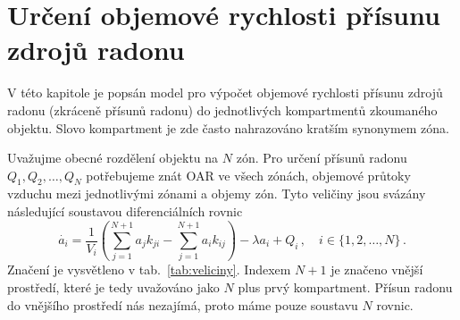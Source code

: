 \chapter{Určení objemové rychlosti přísunu zdrojů radonu}\label{navesti:model}
V této kapitole je popsán model pro výpočet objemové rychlosti přísunu zdrojů radonu (zkráceně přísunů radonu) do jednotlivých kompartmentů zkoumaného objektu. Slovo kompartment je zde často nahrazováno kratším synonymem zóna.

Uvažujme obecné rozdělení objektu na $N$ zón. Pro určení přísunů radonu $Q_1, Q_2, \ldots, Q_N$ potřebujeme znát OAR ve všech zónách, objemové průtoky vzduchu mezi jednotlivými zónami a objemy zón. Tyto veličiny jsou svázány následující soustavou diferenciálních rovnic
\begin{equation}
    \dot{a_i}=\frac{1}{V_i}\left( \sum^{N+1}_{j=1}a_j k_{ji}-\sum^{N+1}_{j=1}a_i k_{ij}\right)-\lambda a_i +Q_i\,,\quad i\in \{1,2,\ldots,N\}\,.\label{eq:odvozovani}
\end{equation}
Značení je vysvětleno v tab.~\ref{tab:veliciny}.
Indexem $N+1$ je značeno vnější prostředí, které je tedy uvažováno jako $N$ plus prvý kompartment. Přísun radonu do vnějšího prostředí nás nezajímá, proto máme pouze soustavu $N$ rovnic.


